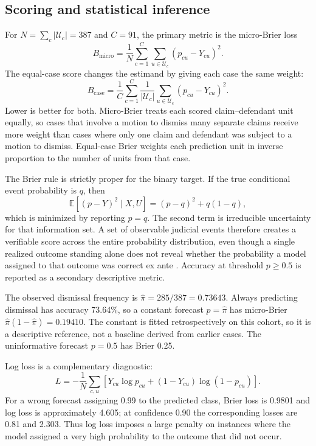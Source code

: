 \documentclass[11pt]{article}
\begin{document}
\subsection{Scoring and statistical inference}
For $N=\sum_c |\mathcal U_c|=387$ and $C=91$, the primary metric is the micro-Brier loss
\begin{equation}
 B_{\mathrm{micro}}=\frac{1}{N}\sum_{c=1}^C\sum_{u\in\mathcal U_c}(p_{cu}-Y_{cu})^2.
\label{eq:micro}
\end{equation}
The equal-case score changes the estimand by giving each case the same weight:
\begin{equation}
 B_{\mathrm{case}}=\frac{1}{C}\sum_{c=1}^C\frac{1}{|\mathcal U_c|}\sum_{u\in\mathcal U_c}(p_{cu}-Y_{cu})^2.
\label{eq:case}
\end{equation}
Lower is better for both. Micro-Brier treats each scored claim--defendant unit equally, so cases that involve a motion to dismiss many separate claims receive more weight than cases where only one claim and defendant was subject to a motion to dismiss. Equal-case Brier weights each prediction unit in inverse proportion to the number of units from that case.

The Brier rule is strictly proper for the binary target. If the true conditional event probability is $q$, then
\begin{equation}
 \mathbb E[(p-Y)^2\mid X,U]=(p-q)^2+q(1-q),
\label{eq:proper}
\end{equation}
which is minimized by reporting $p=q$. The second term is irreducible uncertainty for that information set. A set of observable judicial events therefore creates a verifiable score across the entire probability distribution, even though a single realized outcome standing alone does not reveal whether the probability a model assigned to that outcome was correct ex ante \citep{brier,gneiting}. Accuracy at threshold $p\geq0.5$ is reported as a secondary descriptive metric.

The observed dismissal frequency is $\widehat\pi=285/387=0.73643$. Always predicting dismissal has accuracy 73.64\%, so a constant forecast $p=\widehat\pi$ has micro-Brier $\widehat\pi(1-\widehat\pi)=0.19410$. The constant is fitted retrospectively on this cohort, so it is a descriptive reference, not a baseline derived from earlier cases. The uninformative forecast $p=0.5$ has Brier 0.25.

Log loss is a complementary diagnostic:
\begin{equation}
 L=-\frac{1}{N}\sum_{c,u}\left[Y_{cu}\log p_{cu}+(1-Y_{cu})\log(1-p_{cu})\right].
\end{equation}
For a wrong forecast assigning 0.99 to the predicted class, Brier loss is 0.9801 and log loss is approximately 4.605; at confidence 0.90 the corresponding losses are 0.81 and 2.303. Thus log loss imposes a large penalty on instances where the model assigned a very high probability to the outcome that did not occur.
\end{document}
